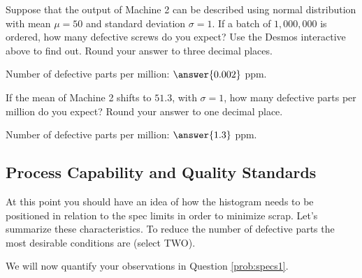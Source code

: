 \documentclass{ximera}
\begin{document}
\begin{question}\label{ex:defParts3}
    Suppose that the output of Machine 2 can be described using normal distribution with mean $\mu=50$ and standard deviation $\sigma=1$.  If a batch of $1,000,000$ is ordered, how many defective screws do you expect?  Use the Desmos interactive above to find out.  Round your answer to three decimal places.

    Number of defective parts per million: $\answer{0.002}$ ppm.

    If the mean of Machine 2 shifts to $51.3$, with $\sigma =1$, how many defective parts per million do you expect?  Round your answer to one decimal place.

    Number of defective parts per million: $\answer{1.3}$ ppm.
\end{question}

\subsection*{Process Capability and Quality Standards}
\begin{question}\label{prob:specs1}
At this point you should have an idea of how the histogram needs to be positioned in relation to the spec limits in order to minimize scrap.  Let's summarize these characteristics.  To reduce the number of defective parts the most desirable conditions are (select TWO).

    \begin{selectAll}
    \end{selectAll}
\end{question}

We will now quantify your observations in Question \ref{prob:specs1}.
\end{document}
